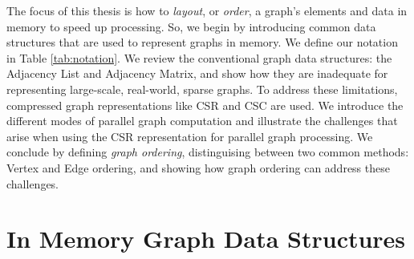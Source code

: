 The focus of this thesis is how to \textit{layout}, or \textit{order}, a graph's elements and data in memory to speed up processing. So, we begin by introducing common data structures that are used to represent graphs in memory. 
 We define our notation in Table \ref{tab:notation}. We review the conventional graph data structures: the Adjacency List and Adjacency Matrix, and show how they are inadequate for representing large-scale, real-world, sparse graphs. To address these limitations, compressed graph representations like \ac{CSR} and \ac{CSC} are used. 
We introduce the different modes of parallel graph computation and illustrate the challenges that arise when using the \ac{CSR} representation for parallel graph processing. We conclude by defining \textit{graph ordering}, distinguising between two common methods: Vertex and Edge ordering, and showing how graph
ordering can address these challenges. 
\clearpage


\section{In Memory Graph Data Structures}


